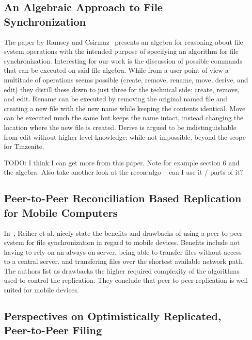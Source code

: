 \subsection{An Algebraic Approach to File Synchronization}
\label{sub:An Algebraic Approach to File Synchronization}

The paper by Ramsey and Csirmaz~\cite{ramsey2001algebraic} presents an algebra for reasoning about file system operations with the intended purpose of specifying an algorithm for file synchronization.
Interesting for our work is the discussion of possible commands that can be executed on said file algebra.
While from a user point of view a multitude of operations seems possible (create, remove, rename, move, derive, and edit) they distill these down to just three for the technical side: create, remove, and edit.
Rename can be executed by removing the original named file and creating a new file with the new name while keeping the contents identical.
Move can be executed much the same but keeps the name intact, instead changing the location where the new file is created.
Derive is argued to be indistinguishable from edit without higher level knowledge: while not impossible, beyond the scope for Tinzenite.

TODO: I think I can get more from this paper.
Note for example section 6 and the algebra.
Also take another look at the recon algo – can I use it / parts of it?

\subsection{Peer-to-Peer Reconciliation Based Replication for Mobile Computers}
\label{sub:Peer-to-Peer Reconciliation Based Replication for Mobile Computers}

In~\cite{reiher1996peer}, Reiher et al. nicely state the benefits and drawbacks of using a peer to peer system for file synchronization in regard to mobile devices.
Benefits include not having to rely on an always on server, being able to transfer files without access to a central server, and transfering files over the shortest available network path.
The authors list as drawbacks the higher required complexity of the algorithms used to control the replication.
They conclude that peer to peer replication is well suited for mobile devices.

\subsection{Perspectives on Optimistically Replicated, Peer-to-Peer Filing}
\label{sub:Perspectives on Optimistically Replicated, Peer-to-Peer Filing}

